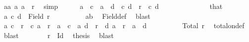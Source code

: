 \begin{isabellebody}
\ aa{\isacharcolon}{\kern0pt}\ {\isachardoublequoteopen}{\isacharparenleft}{\kern0pt}a{\isacharcomma}{\kern0pt}\ a{\isacharparenright}{\kern0pt}\ {\isasymin}\ r{\isachardoublequoteclose}\ \isamarkupfalse%
\ simp\isanewline
\ \ \ \ \isamarkupfalse%
\ {\isachardoublequoteopen}a\ {\isacharequal}{\kern0pt}\ c\ {\isasymand}\ a\ {\isacharequal}{\kern0pt}\ d{\isachardoublequoteclose}\ \ {\isachardoublequoteopen}{\isacharparenleft}{\kern0pt}c{\isacharcomma}{\kern0pt}\ d{\isacharparenright}{\kern0pt}\ {\isasymin}\ r{\isachardoublequoteclose}\ \ c\ d\isanewline
\ \ \ \ \isamarkupfalse%
\ {\isacharminus}{\kern0pt}\isanewline
\ \ \ \ \ \ \isamarkupfalse%
\ that\ \isamarkupfalse%
\ {\isachardoublequoteopen}{\isacharbraceleft}{\kern0pt}a{\isacharcomma}{\kern0pt}\ c{\isacharcomma}{\kern0pt}\ d{\isacharbraceright}{\kern0pt}\ {\isasymsubseteq}\ Field\ r{\isachardoublequoteclose}\isanewline
\ \ \ \ \ \ \ \ \isamarkupfalse%
\ ab\ \isamarkupfalse%
\ Field{\isacharunderscore}{\kern0pt}def\ \isamarkupfalse%
\ blast\isanewline
\ \ \ \ \ \ \isamarkupfalse%
\ \isamarkupfalse%
\ {\isachardoublequoteopen}{\isacharparenleft}{\kern0pt}{\isacharparenleft}{\kern0pt}a{\isacharcomma}{\kern0pt}\ c{\isacharparenright}{\kern0pt}\ {\isasymin}\ r\ {\isasymor}\ {\isacharparenleft}{\kern0pt}c{\isacharcomma}{\kern0pt}\ a{\isacharparenright}{\kern0pt}\ {\isasymin}\ r\ {\isasymor}\ a\ {\isacharequal}{\kern0pt}\ c{\isacharparenright}{\kern0pt}\ {\isasymand}\ {\isacharparenleft}{\kern0pt}{\isacharparenleft}{\kern0pt}a{\isacharcomma}{\kern0pt}\ d{\isacharparenright}{\kern0pt}\ {\isasymin}\ r\ {\isasymor}\ {\isacharparenleft}{\kern0pt}d{\isacharcomma}{\kern0pt}\ a{\isacharparenright}{\kern0pt}\ {\isasymin}\ r\ {\isasymor}\ a\ {\isacharequal}{\kern0pt}\ d{\isacharparenright}{\kern0pt}{\isachardoublequoteclose}\isanewline
\ \ \ \ \ \ \ \ \isamarkupfalse%
\ {\isacartoucheopen}Total\ r{\isacartoucheclose}\ \isamarkupfalse%
\ total{\isacharunderscore}{\kern0pt}on{\isacharunderscore}{\kern0pt}def\ \isamarkupfalse%
\ blast\isanewline
\ \ \ \ \ \ \isamarkupfalse%
\ {\isacartoucheopen}r\ {\isasymsubseteq}\ Id{\isacartoucheclose}\ \isamarkupfalse%
\ {\isacharquery}{\kern0pt}thesis\ \isamarkupfalse%
\ blast\isanewline
\ \ \ \ \isamarkupfalse%
\isanewline
\ \ \ \ \isamarkupfalse%

\end{isabellebody}
